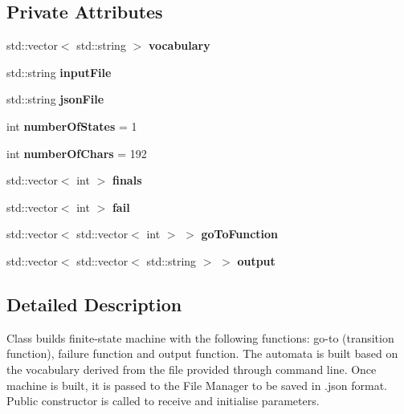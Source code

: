 \subsection*{Private Attributes}
\begin{DoxyCompactItemize}
\item 
\mbox{\label{classAhoCorasick_ae1cdee1728e71d6f655c8741b817885d}} 
std\+::vector$<$ std\+::string $>$ {\bfseries vocabulary}
\item 
\mbox{\label{classAhoCorasick_a89e2087e9f8578e0abb494b8fca9dff5}} 
std\+::string {\bfseries input\+File}
\item 
\mbox{\label{classAhoCorasick_a6c0cb26993e6621b79e1bf9789c05268}} 
std\+::string {\bfseries json\+File}
\item 
\mbox{\label{classAhoCorasick_a05555f17e68db9e365beba7e0da27afa}} 
int {\bfseries number\+Of\+States} = 1
\item 
\mbox{\label{classAhoCorasick_a4d72b01f0b7cc5bea7332fda95e947e0}} 
int {\bfseries number\+Of\+Chars} = 192
\item 
\mbox{\label{classAhoCorasick_a70392b02ae0eda74648ce764759ebefd}} 
std\+::vector$<$ int $>$ {\bfseries finals}
\item 
\mbox{\label{classAhoCorasick_a5d4397d63ac27b704671974af7b80605}} 
std\+::vector$<$ int $>$ {\bfseries fail}
\item 
\mbox{\label{classAhoCorasick_aa39fadd7513e7d410fcc8252f684d52e}} 
std\+::vector$<$ std\+::vector$<$ int $>$ $>$ {\bfseries go\+To\+Function}
\item 
\mbox{\label{classAhoCorasick_af745171b0eb86c983463f92c30bdbdec}} 
std\+::vector$<$ std\+::vector$<$ std\+::string $>$ $>$ {\bfseries output}
\end{DoxyCompactItemize}


\subsection{Detailed Description}
Class builds finite-\/state machine with the following functions\+: go-\/to (transition function), failure function and output function. The automata is built based on the vocabulary derived from the file provided through command line. Once machine is built, it is passed to the File Manager to be saved in .json format. Public constructor is called to receive and initialise parameters.


